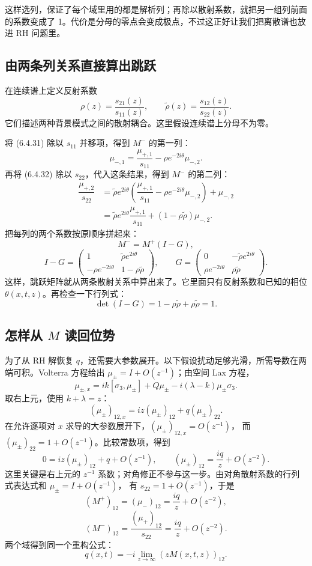 \documentclass[lang=cn,scheme=chinese,mode=simple,device=normal,color=blue,math=cm,thmcnt=section,12pt]{elegantbook}
\newcommand{\eqq}[2]{\tag{#1}\label{eq:#1}#2}
\begin{document}
这样选列，保证了每个域里用的都是解析列；再除以散射系数，就把另一组列前面的系数变成了 1。代价是分母的零点会变成极点，不过这正好让我们把离散谱也放进 RH 问题里。

\subsection*{由两条列关系直接算出跳跃}
在连续谱上定义反射系数
\[
\rho(z)=\dfrac{s_{21}(z)}{s_{11}(z)},\qquad
\widetilde\rho(z)=\dfrac{s_{12}(z)}{s_{22}(z)}.
\]
它们描述两种背景模式之间的散射耦合。这里假设连续谱上分母不为零。

将 (6.4.31) 除以 $s_{11}$ 并移项，得到 $M^-$ 的第一列：
\[
\mu_{-,1}=\dfrac{\mu_{+,1}}{s_{11}}
-\rho e^{-2i\theta}\mu_{-,2}.
\]
再将 (6.4.32) 除以 $s_{22}$，代入这条结果，得到 $M^-$ 的第二列：
\[
\begin{aligned}
\dfrac{\mu_{+,2}}{s_{22}}
&=\widetilde\rho e^{2i\theta}
\left(\dfrac{\mu_{+,1}}{s_{11}}-\rho e^{-2i\theta}\mu_{-,2}\right)+\mu_{-,2}\\
&=\widetilde\rho e^{2i\theta}\dfrac{\mu_{+,1}}{s_{11}}
+(1-\rho\widetilde\rho)\mu_{-,2}.
\end{aligned}
\]
把每列的两个系数按原顺序拼起来：
\begin{equation}\eqq{6.5.5}{M^-=M^+(I-G),}\end{equation}
\[
I-G=\begin{pmatrix}
1&\widetilde\rho e^{2i\theta}\\
-\rho e^{-2i\theta}&1-\rho\widetilde\rho
\end{pmatrix},\qquad
G=\begin{pmatrix}
0&-\widetilde\rho e^{2i\theta}\\
\rho e^{-2i\theta}&\rho\widetilde\rho
\end{pmatrix}.
\tag{6.5.9}
\]
这样，跳跃矩阵就从两条散射关系中算出来了。它里面只有反射系数和已知的相位 $\theta(x,t,z)$。再检查一下行列式：
\[
\det(I-G)=1-\rho\widetilde\rho+\rho\widetilde\rho=1.
\]

\subsection*{怎样从 \(M\) 读回位势}
为了从 RH 解恢复 $q$，还需要大参数展开。以下假设扰动足够光滑，所需导数在两端可积。Volterra 方程给出 $\mu_\pm=I+O(z^{-1})$；由空间 Lax 方程，
\[
\mu_{\pm,x}=ik[\sigma_3,\mu_\pm]+Q\mu_\pm
-i(\lambda-k)\mu_\pm\sigma_3.
\]
取右上元，使用 $k+\lambda=z$：
\[
(\mu_\pm)_{12,x}=iz(\mu_\pm)_{12}+q(\mu_\pm)_{22}.
\]
在允许逐项对 $x$ 求导的大参数展开下，$(\mu_\pm)_{12,x}=O(z^{-1})$，
而 $(\mu_\pm)_{22}=1+O(z^{-1})$。比较常数项，得到
\[
0=iz(\mu_\pm)_{12}+q+O(z^{-1}),\qquad
(\mu_\pm)_{12}=\dfrac{iq}{z}+O(z^{-2}).
\]
这里关键是右上元的 $z^{-1}$ 系数；对角修正不参与这一步。由对角散射系数的行列式表达式和 $\mu_\pm=I+O(z^{-1})$，
有 $s_{22}=1+O(z^{-1})$，于是
\[
(M^+)_{12}=(\mu_-)_{12}=\dfrac{iq}{z}+O(z^{-2}),
\]
\[
(M^-)_{12}=\dfrac{(\mu_+)_{12}}{s_{22}}
=\dfrac{iq}{z}+O(z^{-2}).
\]
两个域得到同一个重构公式：
\[
\boxed{q(x,t)=-i\lim\limits_{z\to\infty}(zM(x,t,z))_{12}.}
\]
\end{document}
